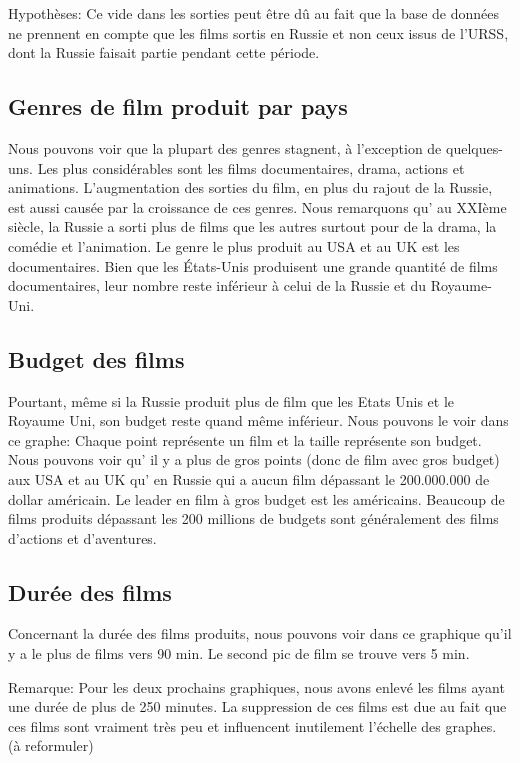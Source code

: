 \documentclass{article}
\begin{document}

Hypothèses: Ce vide dans les sorties peut être dû au fait que la base de données ne prennent en compte que les films sortis en Russie et non ceux issus de l'URSS, dont la Russie faisait partie pendant cette période.

\subsection*{Genres de film produit par pays}

Nous pouvons voir que la plupart des genres stagnent, à l'exception de quelques-uns. Les plus considérables sont les films documentaires, drama, actions et animations. L’augmentation des sorties du film, en plus du rajout de la Russie, est aussi causée par la croissance de ces genres. Nous remarquons qu' au XXIème siècle, la Russie a sorti plus de films que les autres surtout pour de la drama, la comédie et l’animation. Le genre le plus produit au USA et au UK est les documentaires. Bien que les États-Unis produisent une grande quantité de films documentaires, leur nombre reste inférieur à celui de la Russie et du Royaume-Uni.

\subsection*{Budget des films}
Pourtant, même si la Russie produit plus de film que les Etats Unis  et le Royaume Uni, son budget reste quand même inférieur. Nous pouvons le voir dans ce graphe:
Chaque point représente un film et la taille représente son budget. Nous pouvons voir qu' il y a plus de gros points (donc de film avec gros budget) aux USA et au UK qu' en Russie qui a aucun film dépassant le 200.000.000 de dollar américain. Le leader en film à gros budget est les américains.  Beaucoup de films produits dépassant les 200 millions de budgets sont généralement des films d’actions et d'aventures. 

\subsection*{Durée des films}
Concernant la durée des films produits, nous pouvons voir dans ce graphique qu’il y a le plus de films vers 90 min. Le second pic de film se trouve vers 5 min. 

Remarque: Pour les deux prochains graphiques, nous avons enlevé les films ayant une durée de plus de 250 minutes. La suppression de ces films est due au fait que ces films sont vraiment très peu et influencent inutilement l’échelle des graphes. (à reformuler) 
\end{document}
